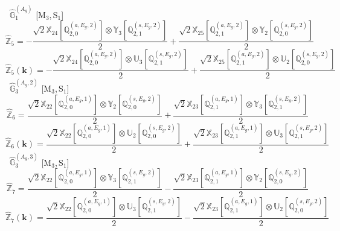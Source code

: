 \documentclass[fleqn,10pt,landscape]{article}
\begin{document}
\begin{itemize}
\begin{dmath*}
\end{dmath*}
\vspace{4mm}
\noindent {} $\,\,\,\hat{\mathbb{G}}_{1}^{(A_{g})}$ [M$_{3}$,\,S$_{1}$]
\begin{dmath*}
\hat{\mathbb{Z}}_{5}=- \frac{\sqrt{2} \mathbb{X}_{24}[\mathbb{Q}_{2,0}^{(a,E_{g},2)}] \otimes\mathbb{Y}_{3}[\mathbb{Q}_{2,1}^{(s,E_{g},2)}]}{2} + \frac{\sqrt{2} \mathbb{X}_{25}[\mathbb{Q}_{2,1}^{(a,E_{g},2)}] \otimes\mathbb{Y}_{2}[\mathbb{Q}_{2,0}^{(s,E_{g},2)}]}{2}
\end{dmath*}
\begin{dmath*}
\hat{\mathbb{Z}}_{5}(\bm{k})=- \frac{\sqrt{2} \mathbb{X}_{24}[\mathbb{Q}_{2,0}^{(a,E_{g},2)}] \otimes\mathbb{U}_{3}[\mathbb{Q}_{2,1}^{(s,E_{g},2)}]}{2} + \frac{\sqrt{2} \mathbb{X}_{25}[\mathbb{Q}_{2,1}^{(a,E_{g},2)}] \otimes\mathbb{U}_{2}[\mathbb{Q}_{2,0}^{(s,E_{g},2)}]}{2}
\end{dmath*}
\vspace{4mm}
\noindent {} $\,\,\,\hat{\mathbb{G}}_{3}^{(A_{g},2)}$ [M$_{3}$,\,S$_{1}$]
\begin{dmath*}
\hat{\mathbb{Z}}_{6}=\frac{\sqrt{2} \mathbb{X}_{22}[\mathbb{Q}_{2,0}^{(a,E_{g},1)}] \otimes\mathbb{Y}_{2}[\mathbb{Q}_{2,0}^{(s,E_{g},2)}]}{2} + \frac{\sqrt{2} \mathbb{X}_{23}[\mathbb{Q}_{2,1}^{(a,E_{g},1)}] \otimes\mathbb{Y}_{3}[\mathbb{Q}_{2,1}^{(s,E_{g},2)}]}{2}
\end{dmath*}
\begin{dmath*}
\hat{\mathbb{Z}}_{6}(\bm{k})=\frac{\sqrt{2} \mathbb{X}_{22}[\mathbb{Q}_{2,0}^{(a,E_{g},1)}] \otimes\mathbb{U}_{2}[\mathbb{Q}_{2,0}^{(s,E_{g},2)}]}{2} + \frac{\sqrt{2} \mathbb{X}_{23}[\mathbb{Q}_{2,1}^{(a,E_{g},1)}] \otimes\mathbb{U}_{3}[\mathbb{Q}_{2,1}^{(s,E_{g},2)}]}{2}
\end{dmath*}
\vspace{4mm}
\noindent {} $\,\,\,\hat{\mathbb{G}}_{3}^{(A_{g},3)}$ [M$_{3}$,\,S$_{1}$]
\begin{dmath*}
\hat{\mathbb{Z}}_{7}=\frac{\sqrt{2} \mathbb{X}_{22}[\mathbb{Q}_{2,0}^{(a,E_{g},1)}] \otimes\mathbb{Y}_{3}[\mathbb{Q}_{2,1}^{(s,E_{g},2)}]}{2} - \frac{\sqrt{2} \mathbb{X}_{23}[\mathbb{Q}_{2,1}^{(a,E_{g},1)}] \otimes\mathbb{Y}_{2}[\mathbb{Q}_{2,0}^{(s,E_{g},2)}]}{2}
\end{dmath*}
\begin{dmath*}
\hat{\mathbb{Z}}_{7}(\bm{k})=\frac{\sqrt{2} \mathbb{X}_{22}[\mathbb{Q}_{2,0}^{(a,E_{g},1)}] \otimes\mathbb{U}_{3}[\mathbb{Q}_{2,1}^{(s,E_{g},2)}]}{2} - \frac{\sqrt{2} \mathbb{X}_{23}[\mathbb{Q}_{2,1}^{(a,E_{g},1)}] \otimes\mathbb{U}_{2}[\mathbb{Q}_{2,0}^{(s,E_{g},2)}]}{2}

\end{dmath*}
\end{itemize}
\end{document}

